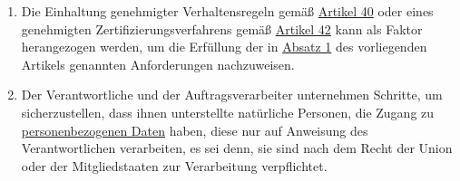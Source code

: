 \begin{enumerate}
  \item Die Einhaltung genehmigter Verhaltensregeln gemäß \hyperref[ch:40]{Artikel 40} oder eines genehmigten
   Zertifizierungsverfahrens gemäß \hyperref[ch:42]{Artikel 42} kann als Faktor herangezogen werden, um die Erfüllung
   der in \hyperref[itm:32-1]{Absatz 1} des vorliegenden Artikels genannten Anforderungen nachzuweisen.
  \label{itm:32-3}

  \item Der Verantwortliche und der Auftragsverarbeiter unternehmen Schritte, um sicherzustellen, dass ihnen
   unterstellte natürliche Personen, die Zugang zu \hyperref[itm:04-1]{personenbezogenen Daten} haben, diese nur auf Anweisung des
   Verantwortlichen verarbeiten, es sei denn, sie sind nach dem Recht der Union oder der Mitgliedstaaten zur
   Verarbeitung verpflichtet.
  \label{itm:32-4}

\end{enumerate}



